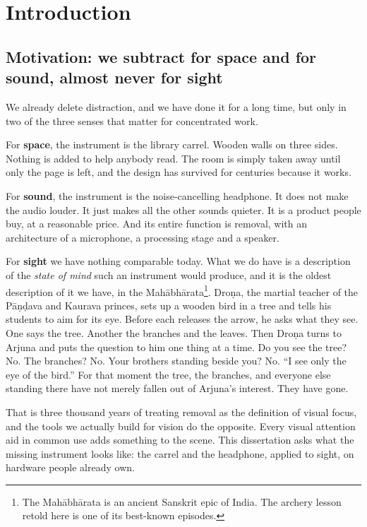\chapter{Introduction}

\section{Motivation: we subtract for space and for sound, almost never for sight}

We already delete distraction, and we have done it for a long time, but only in two of the three
senses that matter for concentrated work.

For \textbf{space}, the instrument is the library carrel. Wooden walls on three sides. Nothing is
added to help anybody read. The room is simply taken away until only the page is left, and the design
has survived for centuries because it works.

For \textbf{sound}, the instrument is the noise-cancelling headphone. It does not make the audio
louder. It just makes all the other sounds quieter. It is a product people buy, at a reasonable
price. And its entire function is removal, with an architecture of a microphone, a processing stage
and a speaker.

For \textbf{sight} we have nothing comparable today. What we do have is a description of the
\textit{state of mind} such an instrument would produce, and it is the oldest description of it we
have, in the
Mah\=abh\=arata\footnote{The Mah\=abh\=arata is an ancient Sanskrit epic of India. The archery
lesson retold here is one of its best-known episodes.}. Dro\d{n}a, the martial teacher of the P\=a\d{n}\d{d}ava and Kaurava princes, sets up
a wooden bird in a tree and tells his students to aim for its eye. Before each releases the arrow, he
asks what they see. One says the tree. Another the branches and the leaves. Then Dro\d{n}a turns to
Arjuna and puts the question to him one thing at a time. Do you see the tree? No. The branches? No.
Your brothers standing beside you? No. ``I see only the eye of the bird.'' For that moment the tree,
the branches, and everyone else standing there have not merely fallen out of Arjuna's interest. They
have gone.

That is three thousand years of treating removal as the definition of visual focus, and the tools we
actually build for vision do the opposite. Every visual attention aid in common use adds something
to the scene. This dissertation asks what the missing instrument looks like: the carrel and the
headphone, applied to sight, on hardware people already own.

